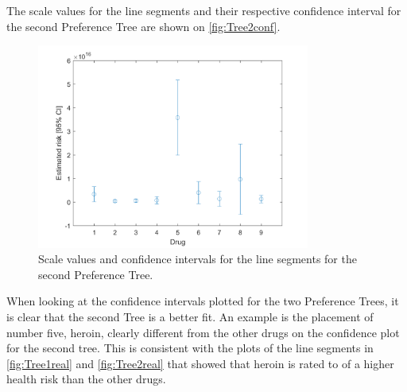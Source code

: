 \noindent
%
The scale values for the line segments and their respective confidence interval for the second Preference Tree are shown on \autoref{fig:Tree2conf}.
%
\begin{figure}[H]
	\centering
	\includegraphics[width = 0.80\textwidth]{Figure/confidense_p1414}
	\caption{Scale values and confidence intervals for the line segments for the second Preference Tree.}
	\label{fig:Tree2conf}
\end{figure}
\noindent
%
When looking at the confidence intervals plotted for the two Preference Trees, it is clear that the second Tree is a better fit. An example is the placement of number five, heroin, clearly different from the other drugs on the confidence plot for the second tree. This is consistent with the plots of the line segments in \autoref{fig:Tree1real} and \autoref{fig:Tree2real} that showed that heroin is rated to of a higher health risk than the other drugs. 